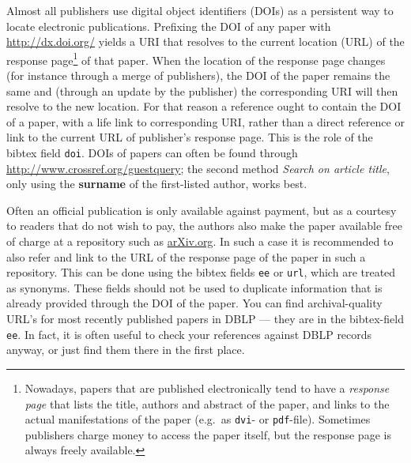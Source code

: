 \documentclass[]{rptuseminar}
\begin{document}
Almost all publishers use digital object identifiers (DOIs) as a persistent way to locate electronic publications.
Prefixing the DOI of any paper with \url{http://dx.doi.org/} yields a URI that resolves to the current location (URL) of the response page\footnote{Nowadays, papers that are published electronically tend to have a \emph{response page} that lists the title, authors and abstract of the paper, and links to the actual manifestations of the paper (e.g.\ as \texttt{dvi}- or \texttt{pdf}-file).
Sometimes publishers charge money to access the paper itself, but the response page is always freely available.} of that paper.
When the location of the response page changes (for instance through a merge of publishers), the DOI of the paper remains the same and (through an update by the publisher) the corresponding URI will then resolve to the new location.
For that reason a reference ought to contain the DOI of a paper, with a life link to corresponding URI, rather than a direct reference or link to the current URL of publisher's response page.
This is the role of the bibtex field \texttt{doi}.
DOIs of papers can often be found through \url{http://www.crossref.org/guestquery}; the second method {\itshape Search on article title}, only using the {\bfseries surname} of the first-listed author, works best.

Often an official publication is only available against payment, but as a courtesy to readers that do not wish to pay, the authors also make the paper available free of charge at a repository such as \url{arXiv.org}.
In such a case it is recommended to also refer and link to the URL of the response page of the paper in such a repository.
This can be done using the bibtex fields \texttt{ee} or \texttt{url}, which are treated as synonyms.
These fields should not be used to duplicate information that is already provided through the DOI of the paper.
You can find archival-quality URL's for most recently published papers in DBLP --- they are in the bibtex-field \texttt{ee}.
In fact, it is often useful to check your references against DBLP records anyway, or just find them there in the first place.

\newpage
\nocite{*}



\end{document}
